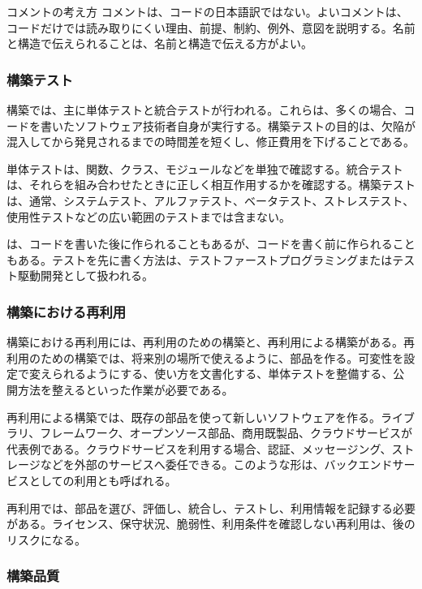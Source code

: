 \documentclass[a4paper,11pt]{ltjsarticle}
\numberwithin{figure}{section}
\numberwithin{table}{section}
\begin{document}
\begin{keybox}{コメントの考え方}
コメントは、コードの日本語訳ではない。よいコメントは、コードだけでは読み取りにくい理由、前提、制約、例外、意図を説明する。名前と構造で伝えられることは、名前と構造で伝える方がよい。
\end{keybox}

\subsubsection{構築テスト}

構築では、主に単体テストと統合テストが行われる。これらは、多くの場合、コードを書いたソフトウェア技術者自身が実行する。構築テストの目的は、欠陥が混入してから発見されるまでの時間差を短くし、修正費用を下げることである。

単体テストは、関数、クラス、モジュールなどを単独で確認する。統合テストは、それらを組み合わせたときに正しく相互作用するかを確認する。構築テストは、通常、システムテスト、アルファテスト、ベータテスト、ストレステスト、使用性テストなどの広い範囲のテストまでは含まない。

は、コードを書いた後に作られることもあるが、コードを書く前に作られることもある。テストを先に書く方法は、テストファーストプログラミングまたはテスト駆動開発として扱われる。

\subsubsection{構築における再利用}

構築における再利用には、再利用のための構築と、再利用による構築がある。再利用のための構築では、将来別の場所で使えるように、部品を作る。可変性を設定で変えられるようにする、使い方を文書化する、単体テストを整備する、公開方法を整えるといった作業が必要である。

再利用による構築では、既存の部品を使って新しいソフトウェアを作る。ライブラリ、フレームワーク、オープンソース部品、商用既製品、クラウドサービスが代表例である。クラウドサービスを利用する場合、認証、メッセージング、ストレージなどを外部のサービスへ委任できる。このような形は、バックエンドサービスとしての利用とも呼ばれる。

再利用では、部品を選び、評価し、統合し、テストし、利用情報を記録する必要がある。ライセンス、保守状況、脆弱性、利用条件を確認しない再利用は、後のリスクになる。

\subsubsection{構築品質}
\end{document}
